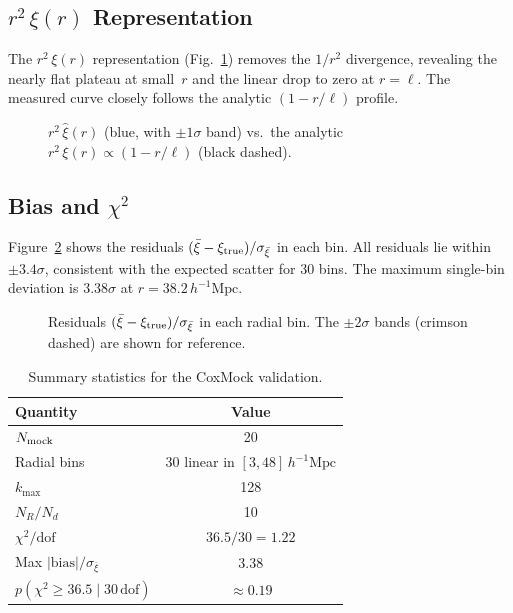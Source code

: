 \documentclass[11pt]{article}
\begin{document}
\subsection{$r^2\,\xi(r)$ Representation}

The $r^2\,\xi(r)$ representation (Fig.~\ref{fig:r2xi}) removes the
$1/r^2$ divergence, revealing the nearly flat plateau at small~$r$ and
the linear drop to zero at $r = \ell$.  The measured curve closely
follows the analytic $(1 - r/\ell)$ profile.

\begin{figure}[ht]
  \centering
  
  \caption{$r^2\,\hat\xi(r)$ (blue, with $\pm 1\sigma$ band) vs.\ the
  analytic $r^2\,\xi(r) \propto (1 - r/\ell)$ (black dashed).}
  \label{fig:r2xi}
\end{figure}

\subsection{Bias and $\chi^2$}

Figure~\ref{fig:residuals} shows the residuals
$(\bar\xi - \xi_{\rm true})/\sigma_{\bar\xi}$ in each bin.
All residuals lie within $\pm 3.4\sigma$, consistent with the expected
scatter for 30 bins.  The maximum single-bin deviation is $3.38\sigma$
at $r = 38.2\,h^{-1}\mathrm{Mpc}$.

\begin{figure}[ht]
  \centering
  
  \caption{Residuals $(\bar\xi - \xi_{\rm true})/\sigma_{\bar\xi}$ in
  each radial bin.  The $\pm 2\sigma$ bands (crimson dashed) are shown
  for reference.}
  \label{fig:residuals}
\end{figure}

\begin{table}[ht]
  \centering
  \caption{Summary statistics for the CoxMock validation.}
  \label{tab:summary}
  \begin{tabular}{@{}lc@{}}
    \toprule
    Quantity & Value \\
    \midrule
    $N_{\rm mock}$ & 20 \\
    Radial bins & 30 linear in $[3, 48]\,h^{-1}\mathrm{Mpc}$ \\
    $k_{\max}$ & 128 \\
    $N_R / N_d$ & 10 \\
    $\chi^2/\mathrm{dof}$ & $36.5/30 = 1.22$ \\
    Max $|\mathrm{bias}|/\sigma_{\bar\xi}$ & 3.38 \\
    $p(\chi^2 \ge 36.5 \mid 30\,\mathrm{dof})$ & $\approx 0.19$ \\
    \bottomrule
  \end{tabular}
\end{table}
\end{document}
